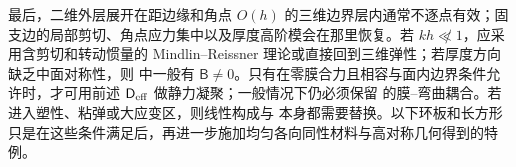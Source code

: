 最后，二维外层展开在距边缘和角点 \(O(h)\) 的三维边界层内通常不逐点有效；固支边的局部剪切、角点应力集中以及厚度高阶模会在那里恢复。若 \(kh\not\ll1\)，应采用含剪切和转动惯量的 Mindlin--Reissner 理论或直接回到三维弹性；若厚度方向缺乏中面对称性，则 中一般有 \(\mathsf B\neq0\)。只有在零膜合力且相容与面内边界条件允许时，才可用前述 \(\mathsf D_{\rm eff}\) 做静力凝聚；一般情况下仍必须保留 的膜--弯曲耦合。若进入塑性、粘弹或大应变区，则线性构成与 本身都需要替换。以下环板和长方形只是在这些条件满足后，再进一步施加均匀各向同性材料与高对称几何得到的特例。
